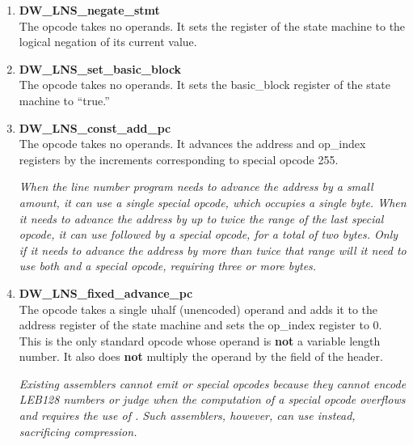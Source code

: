\begin{enumerate}[1.]
\item \textbf{DW\-\_LNS\-\_negate\-\_stmt} \\
The  opcode takes no
operands. It sets the  register of the state machine
to the logical negation of its current value.

\item \textbf{DW\-\_LNS\-\_set\-\_basic\-\_block} \\
The 
opcode
takes no operands. 
It sets the basic\_block register of the
state machine to ``true.''



\item \textbf{DW\-\_LNS\-\_const\-\_add\-\_pc} \\
The  opcode takes
no operands. It advances the address and op\_index registers
by the increments corresponding to special opcode 255.

\textit{When the line number program needs to advance the address
by a small amount, it can use a single special opcode,
which occupies a single byte. When it needs to advance the
address by up to twice the range of the last special opcode,
it can use  followed by a special opcode,
for a total of two bytes. Only if it needs to advance the
address by more than twice that range will it need to use
both  and a special opcode, requiring three
or more bytes.}

\item \textbf{DW\-\_LNS\-\_fixed\-\_advance\-\_pc} \\ 
The  opcode
takes a single uhalf (unencoded) operand and adds it to the
address register of the state machine and sets the op\_index
register to 0. This is the only standard opcode whose operand
is \textbf{not} a variable length number. It also does 
\textbf{not} multiply the
operand by the  field of the header.

\textit{Existing assemblers cannot emit  or special
opcodes because they cannot encode LEB128 numbers or judge when
the computation of a special opcode overflows and requires
the use of . Such assemblers, however, can
use  instead, sacrificing compression.}


\end{enumerate}
